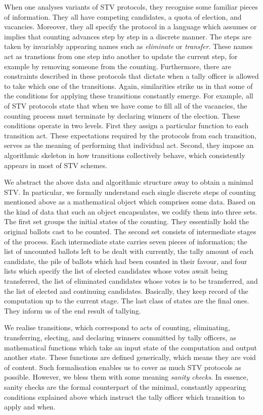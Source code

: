 \documentclass{llncs}
\begin{document}
 
When one analyses variants of STV protocols, they recognise some familiar pieces of information. They all have competing candidates, a quota of election, and vacancies. Moreover, they all specify the protocol in a language which assumes or implies that counting advances step by step in a discrete manner. The steps are taken by invariably appearing names such as \emph{eliminate} or \emph{transfer}. These names act as transtions from one step into another to update the current step, for example by removing someone from the counting. Furthermore, there are constraints described in these protocols that dictate when a tally officer is allowed to take which one of the transitions.  Again, similarities strike us in that some of the conditions for applying these transitions constantly   emerge. For example, all of STV protocols state that when we have come to fill all of the vacancies, the counting process must terminate by declaring winners of the election. These conditions operate in two levels. First they assign a particular function to each transition act. These expectations required by the protocols from each transition, serves as the meaning of performing that individual act. Second, they impose an algorithmic skeleton in how transitions collectively behave, which consistently appears in most of STV schemes.


We abstract the above data and algorithmic structure away to obtain a minimal STV. In particular, we formally understand each single discrete steps of counting mentioned above as a mathematical object which comprises some data. Based on the kind of data that such an object encapsulates, we codify them into three sets. The first set groups the initial states of the counting. They essentially hold the original ballots cast to be counted. The second set consists of intermediate stages of the process. Each intermediate state carries seven pieces of information; the list of uncounted ballots left to be dealt with currently, the tally amount of each candidate, the pile of ballots which had been counted in their favour, and four lists which specify the list of elected candidates whose votes await being transferred, the list of eliminated candidates whose votes is to be transferred, and the list of elected and continuing candidates. Basically, they keep record of the computation up to the current stage. The last class of states are the final ones. They inform us of the end result of  tallying.


We realise transitions, which correspond to acts of counting, eliminating, transferring, electing, and declaring winners committed by tally officers, as mathematical functions which take an input state of the computation and output another state. These functions are defined generically, which means they are void of content. Such formalisation enables us to cover as much STV protocols as possible. However, we bless them with some meaning \emph{sanity checks}. In essence, sanity checks are the formal counterpart of the  minimal, constantly appearing conditions explained above which instruct the tally officer which transition to apply and when.  
\end{document}
